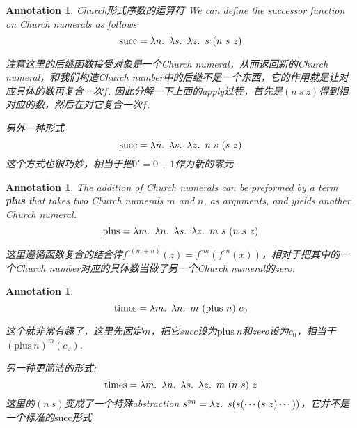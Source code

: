 \documentclass{article}
\theoremstyle{plain}
\newtheorem{annotation}[theorem]{Annotation}
\theoremstyle{nonumberplain}
\newcommand{\lam}[2]{\ensuremath{\lambda #1\ldotp~ #2}} %
\begin{document}
\begin{annotation}
\rm {\color{red}Church形式序数的运算符} We can define the successor function on Church numerals as follows
$$
\text{succ} = \lam{n}{\lam{s}{\lam{z}{s~(n~s~z)}}}
$$

{\color{blue} 注意这里的后继函数接受对象是一个Church numeral，从而返回新的Church numeral，和我们构造Church number中的后继不是一个东西，它的作用就是让对应具体的数再复合一次$f$. 因此分解一下上面的apply过程，首先是$(n~s~z)$得到相对应的数，然后在对它复合一次$f$}.

另外一种形式
$$
\text{succ} = \lam{n}{\lam{s}{\lam{z}{n~s~(s~z)}}}
$$
{\color{blue} 这个方式也很巧妙，相当于把$0' = 0 + 1$作为新的零元}.
\end{annotation}

\begin{annotation}
\rm The addition of Church numerals can be preformed by a term \textbf{plus} that takes two Church numerals $m$ and $n$, as arguments, and yields another Church numeral. 
$$
\text{plus} = \lam{m}{\lam{n}{\lam{s}{\lam{z}{m~s~(n~s~z)}}}}
$$

{\color{blue} 这里遵循函数复合的结合律$f^{\circ(m+n)}(z) = f^{\circ m}(f^{\circ n}(x))$，相对于把其中的一个Church number对应的具体数当做了另一个Church numeral的zero}.
\end{annotation} 

\begin{annotation} \rm
$$
\text{times} = \lam{m}{\lam{n}{m~(\text{plus}~n)~c_0}}
$$

{\color{blue} 这个就非常有趣了，这里先固定$m$，把它succ设为$\text{plus}~n$和zero设为$c_0$，相当于$(\text{plus}~n)^m(c_0)$}.

另一种更简洁的形式:
$$
\text{times} = \lam{m}{\lam{n}{\lam{s}{\lam{z}{m~(n~s)~z}}}}
$$
{\color{blue} 这里的$(n~s)$变成了一个特殊abstraction $s^{\circ n} = \lam{z}{s(s(\cdots(s~z)\cdots))}$，它并不是一个标准的$\text{succ}$形式}
\end{annotation}
\end{document}
